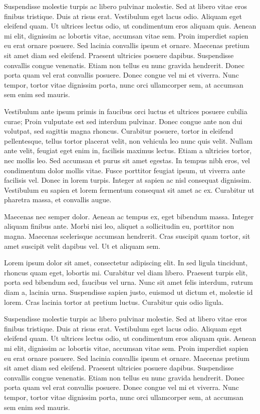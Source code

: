Suspendisse molestie turpis ac libero pulvinar molestie. Sed at libero vitae eros finibus tristique. Duis at risus erat. Vestibulum eget lacus odio. Aliquam eget eleifend quam. Ut ultrices lectus odio, ut condimentum eros aliquam quis. Aenean mi elit, dignissim ac lobortis vitae, accumsan vitae sem. Proin imperdiet sapien eu erat ornare posuere. Sed lacinia convallis ipsum et ornare. Maecenas pretium sit amet diam sed eleifend. Praesent ultricies posuere dapibus. Suspendisse convallis congue venenatis. Etiam non tellus eu nunc gravida hendrerit. Donec porta quam vel erat convallis posuere. Donec congue vel mi et viverra. Nunc tempor, tortor vitae dignissim porta, nunc orci ullamcorper sem, at accumsan sem enim sed mauris. 

Vestibulum ante ipsum primis in faucibus orci luctus et ultrices posuere cubilia curae; Proin vulputate est sed interdum pulvinar. Donec congue ante non dui volutpat, sed sagittis magna rhoncus. Curabitur posuere, tortor in eleifend pellentesque, tellus tortor placerat velit, non vehicula leo nunc quis velit. Nullam ante velit, feugiat eget enim in, facilisis maximus lectus. Etiam a ultricies tortor, nec mollis leo. Sed accumsan et purus sit amet egestas. In tempus nibh eros, vel condimentum dolor mollis vitae. Fusce porttitor feugiat ipsum, ut viverra ante facilisis vel. Donec in lorem turpis. Integer at sapien ac nisl consequat dignissim. Vestibulum eu sapien et lorem fermentum consequat sit amet ac ex. Curabitur ut pharetra massa, et convallis augue.

Maecenas nec semper dolor. Aenean ac tempus ex, eget bibendum massa. Integer aliquam finibus ante. Morbi nisi leo, aliquet a sollicitudin eu, porttitor non magna. Maecenas scelerisque accumsan hendrerit. Cras suscipit quam tortor, sit amet suscipit velit dapibus vel. Ut et aliquam sem.

Lorem ipsum dolor sit amet, consectetur adipiscing elit. In sed ligula tincidunt, rhoncus quam eget, lobortis mi. Curabitur vel diam libero. Praesent turpis elit, porta sed bibendum sed, faucibus vel urna. Nunc sit amet felis interdum, rutrum diam a, lacinia urna. Suspendisse sapien justo, euismod ut dictum et, molestie id lorem. Cras lacinia tortor at pretium luctus. Curabitur quis odio ligula.

Suspendisse molestie turpis ac libero pulvinar molestie. Sed at libero vitae eros finibus tristique. Duis at risus erat. Vestibulum eget lacus odio. Aliquam eget eleifend quam. Ut ultrices lectus odio, ut condimentum eros aliquam quis. Aenean mi elit, dignissim ac lobortis vitae, accumsan vitae sem. Proin imperdiet sapien eu erat ornare posuere. Sed lacinia convallis ipsum et ornare. Maecenas pretium sit amet diam sed eleifend. Praesent ultricies posuere dapibus. Suspendisse convallis congue venenatis. Etiam non tellus eu nunc gravida hendrerit. Donec porta quam vel erat convallis posuere. Donec congue vel mi et viverra. Nunc tempor, tortor vitae dignissim porta, nunc orci ullamcorper sem, at accumsan sem enim sed mauris. 


